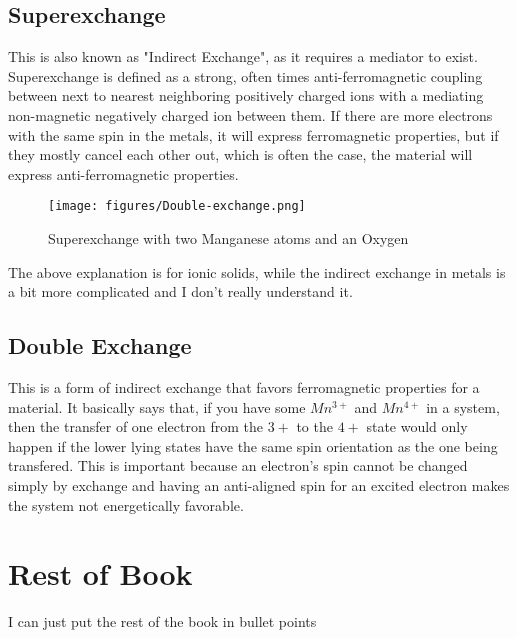 \documentclass[11pt,onecolumn]{article}
\begin{document}
\subsection{Superexchange }

This is also known as "Indirect Exchange", as it requires a mediator to exist. Superexchange is defined as a strong, often times anti-ferromagnetic coupling between next to nearest neighboring positively charged ions with a mediating non-magnetic negatively charged ion between them. If there are more electrons with the same spin in the metals, it will express ferromagnetic properties, but if they mostly cancel each other out, which is often the case, the material will express anti-ferromagnetic properties.\\

\begin{figure}[ht]
	\begin{center}
		\texttt{[image: figures/Double-exchange.png]}
		\caption{Superexchange with two Manganese atoms and an Oxygen}
		\label{fig:4}
	\end{center}
\end{figure}

The above explanation is for ionic solids, while the indirect exchange in metals is a bit more complicated and I don't really understand it.

\subsection{Double Exchange}

This is a form of indirect exchange that favors ferromagnetic properties for a material. It basically says that, if you have some $Mn^{3+}$ and $Mn^{4+}$ in a system, then the transfer of one electron from the $3+$ to the $4+$ state would only happen if the lower lying states have the same spin orientation as the one being transfered. This is important because an electron's spin cannot be changed simply by exchange and having an anti-aligned spin for an excited electron makes the system not energetically favorable. 

\section{Rest of Book}

I can just put the rest of the book in bullet points
\end{document}
